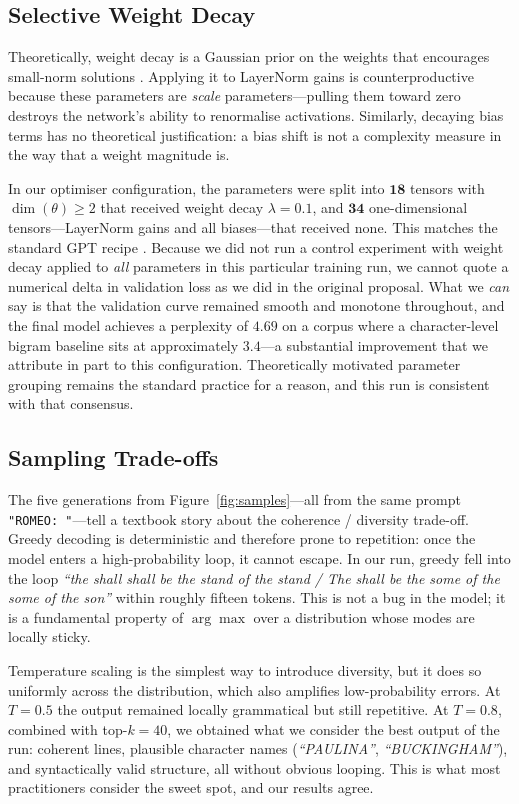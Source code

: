 \subsection{Selective Weight Decay}
Theoretically, weight decay is a Gaussian prior on the weights that
encourages small-norm solutions \parencite{loshchilov2019decoupled}.
Applying it to LayerNorm gains is counterproductive because these
parameters are \emph{scale} parameters---pulling them toward zero destroys
the network's ability to renormalise activations. Similarly, decaying bias
terms has no theoretical justification: a bias shift is not a complexity
measure in the way that a weight magnitude is.

\noindent In our optimiser configuration, the parameters were split into
$\mathbf{18}$ tensors with $\dim(\theta) \geq 2$ that received weight decay
$\lambda = 0.1$, and $\mathbf{34}$ one-dimensional tensors---LayerNorm
gains and all biases---that received none. This matches the standard GPT
recipe \parencite{brown2020language}. Because we did not run a control
experiment with weight decay applied to \emph{all} parameters in this
particular training run, we cannot quote a numerical delta in validation
loss as we did in the original proposal. What we \emph{can} say is that
the validation curve remained smooth and monotone throughout, and the
final model achieves a perplexity of $4.69$ on a corpus where a
character-level bigram baseline sits at approximately $3.4$---a
substantial improvement that we attribute in part to this configuration.
Theoretically motivated parameter grouping remains the standard practice
for a reason, and this run is consistent with that consensus.

\subsection{Sampling Trade-offs}
The five generations from Figure~\ref{fig:samples}---all from the same
prompt \texttt{"ROMEO: "}---tell a textbook story about the coherence /
diversity trade-off. Greedy decoding is deterministic and therefore prone
to repetition: once the model enters a high-probability loop, it cannot
escape. In our run, greedy fell into the loop
\emph{``the shall shall be the stand of the stand / The shall be the some
of the some of the son''} within roughly fifteen tokens. This is not a
bug in the model; it is a fundamental property of $\arg\max$ over a
distribution whose modes are locally sticky.

\noindent Temperature scaling is the simplest way to introduce diversity, but it
does so uniformly across the distribution, which also amplifies
low-probability errors. At $T = 0.5$ the output remained locally
grammatical but still repetitive. At $T = 0.8$, combined with top-$k = 40$,
we obtained what we consider the best output of the run: coherent lines,
plausible character names (\emph{``PAULINA''}, \emph{``BUCKINGHAM''}),
and syntactically valid structure, all without obvious looping. This is
what most practitioners consider the sweet spot, and our results agree.

